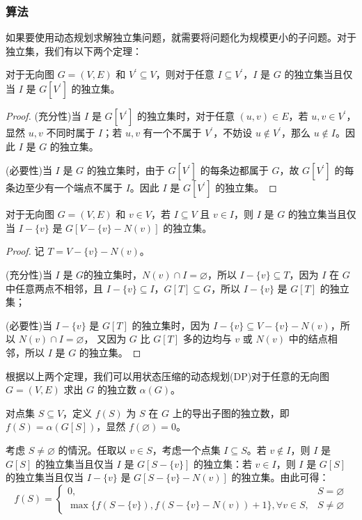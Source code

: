 \documentclass[lang=cn,11pt,a4paper]{elegantpaper}
\begin{document}
\subsubsection{算法}
如果要使用动态规划求解独立集问题，就需要将问题化为规模更小的子问题。对于独立集，我们有以下两个定理：
\begin{theorem}
    对于无向图 $G = (V, E)$ 和 $V^{'} \subseteq V$，则对于任意 $I \subseteq V^{'}$，$I$ 是 $G$ 的独立集当且仅当 $I$ 是 $G[V^{'}]$ 的独立集。
\end{theorem}
\begin{proof}
    (充分性)当 $I$ 是 $G[V^{'}]$ 的独立集时，对于任意 $(u, v) \in E$，若 $u, v \in V^{'}$，显然 $u, v$ 不同时属于 $I$；若 $u, v$ 有一个不属于 $V^{'}$，不妨设 $u \notin V^{'}$，那么 $u \notin I$。因此 $I$ 是 $G$ 的独立集。

    (必要性)当 $I$ 是 $G$ 的独立集时，由于 $G[V^{'}]$ 的每条边都属于 $G$，故 $G[V^{'}]$ 的每条边至少有一个端点不属于 $I$。因此 $I$ 是 $G[V^{'}]$ 的独立集。
\end{proof}

\begin{theorem}
    对于无向图 $G = (V, E)$ 和 $v \in V$，若 $I \subseteq V$ 且 $v \in I$，则 $I$ 是 $G$ 的独立集当且仅当 $I - \{v\}$ 是 $G[V - \{v\} - N(v)]$ 的独立集。
\end{theorem}
\begin{proof}
    记 $T = V - \{v\} - N(v)$。

    (充分性)当 $I$ 是 $G$的独立集时，$N(v) \cap I = \varnothing$，所以 $I - \{v\} \subseteq T$，因为 $I$ 在 $G$ 中任意两点不相邻，且 $I - \{v\} \subseteq I$，$G[T] \subseteq G$，所以 $I - \{v\}$ 是 $G[T]$ 的独立集；

    (必要性)当 $I - \{v\}$ 是 $G[T]$ 的独立集时，因为 $I - \{v\} \subseteq V - \{v\} - N(v)$，所以 $N(v) \cap I = \varnothing$， 又因为 $G$ 比 $G[T]$ 多的边均与 $v$ 或 $N(v)$ 中的结点相邻，所以 $I$ 是 $G$ 的独立集。
\end{proof}

根据以上两个定理，我们可以用状态压缩的动态规划(DP)对于任意的无向图 $G= (V, E)$ 求出 $G$ 的独立数 $\alpha(G)$。

对点集 $S \subseteq V$，定义 $f(S)$ 为 $S$ 在 $G$ 上的导出子图的独立数，即 $f(S) = \alpha(G[S])$，显然 $f(\varnothing) = 0$。

考虑 $S \neq \varnothing$ 的情況。任取以 $v \in S$，考虑一个点集 $I \subseteq S$。若 $v \notin I$，则 $I$ 是 $G[S]$ 的独立集当且仅当 $I$ 是 $G[S - \{v\}]$ 的独立集：若 $v \in I$，则 $I$ 是 $G[S]$ 的独立集当且仅当 $I - \{v\}$ 是 $G[S - \{v\} - N(v)]$ 的独立集。由此可得：
\begin{equation}\label{eq3-1}
    f(S)=\begin{cases}
        0, & S=\varnothing \\
        \max \{f(S-\{v\}), f(S-\{v\}-N(v))+1\}, \forall v \in S, & S \neq \varnothing
    \end{cases}
\end{equation}
\end{document}
